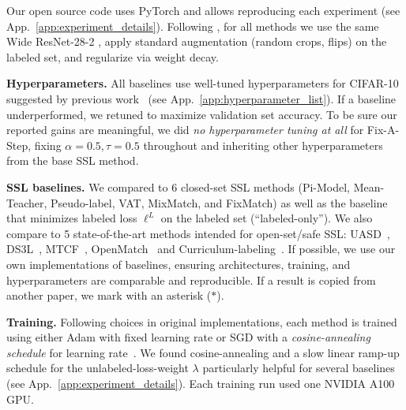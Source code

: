 

Our open source code uses PyTorch \citep{paszke2019pytorch} and allows reproducing each experiment (see App.~\ref{app:experiment_details}).
Following \citet{oliverRealisticEvaluationDeep2018}, for all methods we use the same Wide ResNet-28-2  \citep{zagoruyko2016wide}, apply standard augmentation (random crops, flips) on the labeled set, and regularize via weight decay.

\textbf{Hyperparameters.}
All baselines use well-tuned hyperparameters for CIFAR-10 suggested by previous work ~(see App.~\ref{app:hyperparameter_list}).
If a baseline underperformed, we retuned to maximize validation set accuracy.
To be sure our reported gains are meaningful, we did \emph{no hyperparameter tuning at all} for Fix-A-Step, fixing $\alpha=0.5, \tau=0.5$ throughout and inheriting other hyperparameters from the base SSL method.

\textbf{SSL baselines.} 
We compared to 6 closed-set SSL methods (Pi-Model, Mean-Teacher, Pseudo-label, VAT, MixMatch, and FixMatch) as well as the baseline that minimizes labeled loss $\ell^L$ on the labeled set (``labeled-only'').
We also compare to 5 state-of-the-art methods intended for open-set/safe SSL: UASD~\citep{chenSemiSupervisedLearningClass2020}, DS3L~\citep{guoSafeDeepSemiSupervised2020}, MTCF~\citep{yuMultiTaskCurriculumFramework2020}, OpenMatch~\citep{saitoOpenMatchOpensetConsistency2021} and Curriculum-labeling~\citep{cascante-bonillaCurriculumLabelingRevisiting2021}.
If possible, we use our own implementations of baselines, ensuring architectures, training, and hyperparameters are comparable and reproducible.
If a result is copied from another paper, we mark with an asterisk ($*$).


\textbf{Training.}
Following choices in original implementations, each method is trained using either Adam with fixed learning rate or SGD with a \emph{cosine-annealing schedule} for learning rate~\citep{sohnFixMatchSimplifyingSemisupervised2020}.
We found cosine-annealing and a slow linear ramp-up schedule for the unlabeled-loss-weight $\lambda$ particularly helpful for several baselines (see App.~\ref{app:experiment_details}).
Each training run used one NVIDIA A100 GPU.

